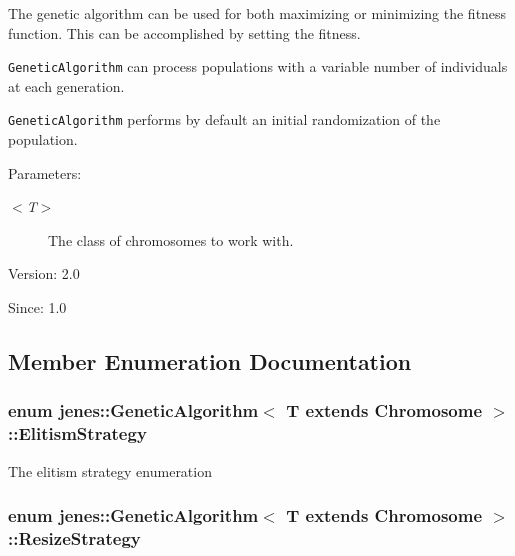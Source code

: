The genetic algorithm can be used for both maximizing or minimizing the fitness function. This can be accomplished by setting the fitness. 

{\tt GeneticAlgorithm} can process populations with a variable number of individuals at each generation. 

{\tt GeneticAlgorithm} performs by default an initial randomization of the population. 

\begin{Desc}
\item[Parameters:]
\begin{description}
\item[{\em $<$T$>$}]The class of chromosomes to work with.\end{description}
\end{Desc}
\begin{Desc}
\item[Version:]2.0 \end{Desc}
\begin{Desc}
\item[Since:]1.0 \end{Desc}


\subsection{Member Enumeration Documentation}
\hypertarget{classjenes_1_1_genetic_algorithm_3_01_t_01extends_01_chromosome_01_4_afb755e144130d2c2c6ca86134dd871e}{
\subsubsection[ElitismStrategy]{\setlength{\rightskip}{0pt plus 5cm}enum jenes::GeneticAlgorithm$<$ T extends Chromosome $>$::{\bf ElitismStrategy}}}
\label{classjenes_1_1_genetic_algorithm_3_01_t_01extends_01_chromosome_01_4_afb755e144130d2c2c6ca86134dd871e}


The elitism strategy enumeration \hypertarget{classjenes_1_1_genetic_algorithm_3_01_t_01extends_01_chromosome_01_4_49749d00b9417b958d1b30e08fc21d53}{
\subsubsection[ResizeStrategy]{\setlength{\rightskip}{0pt plus 5cm}enum jenes::GeneticAlgorithm$<$ T extends Chromosome $>$::{\bf ResizeStrategy}}}
\label{classjenes_1_1_genetic_algorithm_3_01_t_01extends_01_chromosome_01_4_49749d00b9417b958d1b30e08fc21d53}


